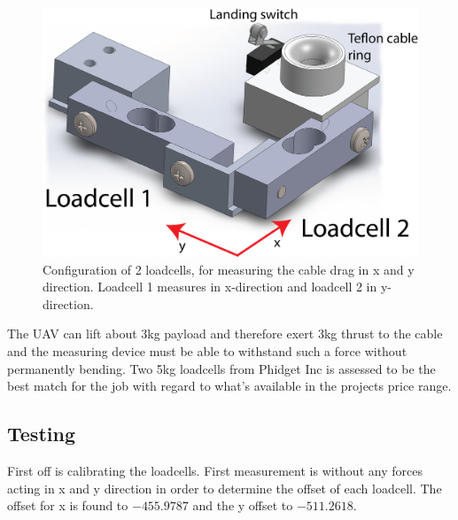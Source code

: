 \begin{figure}[H]
\centering
\includegraphics[scale=0.75]{graphics/cad/loadcell.png}
\caption{Configuration of 2 loadcells, for measuring the cable drag in x and y direction. Loadcell 1 measures in x-direction and loadcell 2 in y-direction.}
\label{fig:loadcells}
\end{figure}

\noindent
The UAV can lift about 3kg payload and therefore exert 3kg thrust to the cable and the measuring device must be able to withstand such a force without permanently bending. Two 5kg loadcells from Phidget Inc is assessed to be the best match for the job with regard to what's available in the projects price range.

\subsection{Testing}
First off is calibrating the loadcells. First measurement is without any forces acting in x and y direction in order to determine the offset of each loadcell.
The offset for x is found to $-455.9787$ and the y offset to $-511.2618$.\\

